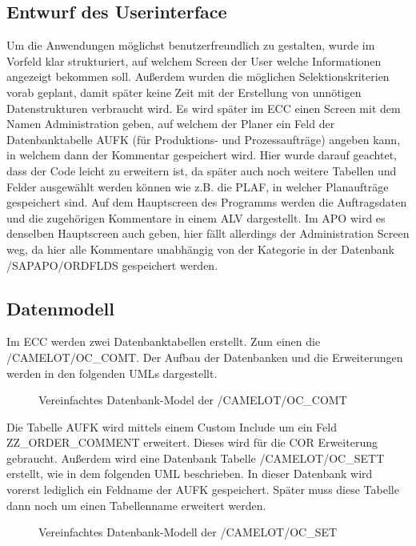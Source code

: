 \subsection{Entwurf des Userinterface}
\label{sec:Benutzeroberflaeche} 
Um die Anwendungen möglichst benutzerfreundlich zu gestalten, wurde im Vorfeld klar strukturiert, auf welchem Screen der User welche Informationen angezeigt bekommen soll. Außerdem wurden die möglichen Selektionskriterien vorab geplant, damit später keine Zeit mit der Erstellung von unnötigen Datenstrukturen verbraucht wird. Es wird später im \ac{ECC} einen Screen mit dem Namen Administration geben, auf welchem der Planer ein Feld der Datenbanktabelle AUFK (für Produktions- und Prozessaufträge) angeben kann, in welchem dann der Kommentar gespeichert wird. Hier wurde darauf geachtet, dass der Code leicht zu erweitern ist, da später auch noch weitere Tabellen und Felder ausgewählt werden können wie z.B. die PLAF, in welcher Planaufträge gespeichert sind. Auf dem Hauptscreen des Programms werden die Auftragsdaten und die zugehörigen Kommentare in einem \ac{ALV} dargestellt. Im \ac{APO} wird es denselben Hauptscreen auch geben, hier fällt allerdings der Administration Screen weg, da hier alle Kommentare unabhängig von der Kategorie in der Datenbank /SAPAPO/ORDFLDS gespeichert werden. 

\subsection{Datenmodell}
\label{sec:Datenmodell}
Im ECC werden zwei Datenbanktabellen erstellt. Zum einen die /CAMELOT/OC\_COMT. Der Aufbau der Datenbanken und die Erweiterungen werden in den folgenden \ac{UML}s dargestellt.

\begin{figure}[htb]
\centering
{}
\caption{Vereinfachtes Datenbank-Model der /CAMELOT/OC\_COMT}
\label{fig:ECC01}
\end{figure} 

Die Tabelle AUFK wird mittels einem Custom Include um ein Feld ZZ\_ORDER\_COMMENT erweitert. Dieses wird für die COR Erweiterung gebraucht. Außerdem wird eine Datenbank Tabelle /CAMELOT/OC\_SETT erstellt, wie in dem folgenden \ac{UML} beschrieben. In dieser Datenbank wird vorerst lediglich ein Feldname der AUFK gespeichert. Später muss diese Tabelle dann noch um einen Tabellenname erweitert werden.

\begin{figure}[htb]
	\centering
	\caption{Vereinfachtes Datenbank-Modell der /CAMELOT/OC\_SET}
	\label{fig:ECC02}
\end{figure} 

